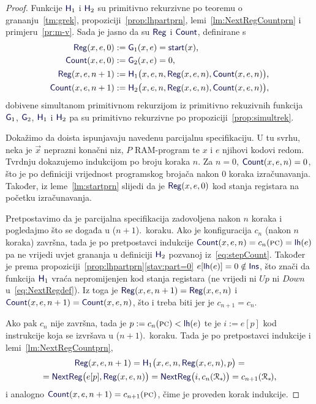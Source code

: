 \begin{proof}
Funkcije $\f H_1$ i $\f H_2$ su primitivno rekurzivne po teoremu o grananju~\ref{tm:grek}, propoziciji~\ref{prop:lhpartprn}, lemi~\ref{lm:NextRegCountprn} i primjeru~\ref{pr:m-v}. Sada je jasno da su $\f{Reg}$ i $\f{Count}$, definirane s
\begin{align}
    \f{Reg}(x,e,0)&:=\f G_1(x,e)=\f{start}(x)\text,\\
    \f{Count}(x,e,0)&:=\f G_2(x,e)=0\text,\\
    \label{eq:stepReg}\f{Reg}(x,e,n+1)&:=\f H_1\bigl(x,e,n,\f{Reg}(x,e,n),\f{Count}(x,e,n)\bigr)\text,\\
    \label{eq:stepCount}\f{Count}(x,e,n+1)&:=\f H_2\bigl(x,e,n,\f{Reg}(x,e,n),\f{Count}(x,e,n)\bigr)\text,
\end{align}
dobivene simultanom primitivnom rekurzijom iz primitivno rekuzivnih funkcija $\f G_1$, $\f G_2$, $\f H_1$ i $\f H_2$ pa su primitivno rekurzivne po propoziciji~\ref{prop:simultrek}.

    Dokažimo da doista ispunjavaju navedenu parcijalnu specifikaciju. U tu svrhu, neka je $\vec x$ neprazni konačni niz, $P$ RAM-program te $x$ i $e$ njihovi kodovi redom. Tvrdnju dokazujemo indukcijom po broju koraka $n$. Za $n=0$, $\f{Count}(x,e,n)=0$, što je po definiciji vrijednost programskog brojača nakon $0$ koraka izračunavanja. Također, iz leme~\ref{lm:startprn} slijedi da je $\f{Reg}(x,e,0)$ kod stanja registara na početku izračunavanja.

	Pretpostavimo da je parcijalna specifikacija zadovoljena nakon $n$ koraka i pogledajmo što se događa u ($n+1$).\ koraku. Ako je konfiguracija $c_n$ (nakon $n$ koraka) završna, tada je po pretpostavci indukcije $\f{Count}(x,e,n)=c_n(\textsc{pc})=\f{lh}(e)$ pa ne vrijedi uvjet grananja u definiciji $\f H_2$ pozvanoj  iz~\eqref{eq:stepCount}. Također je prema propoziciji~\ref{prop:lhpartprn}\eqref{stav:part=0} $e[\f{lh}(e)]=0\notin\f{Ins}$, što znači da funkcija $\f H_1$ vraća nepromijenjen kod stanja registara (ne vrijedi ni $Up$ ni $Down$ u~\eqref{eq:NextRegdef}). Iz toga je $\f{Reg}(x,e,n+1)=\f{Reg}(x,e,n)$ i $\f{Count}(x,e,n+1)=\f{Count}(x,e,n)$, što i treba biti jer je $c_{n+1}=c_n$.

Ako pak $c_n$ nije završna, tada je $p:=c_n(\textsc{pc})<\f{lh}(e)$ te je $i:=e[p]$ kod instrukcije koja se izvršava u ($n+1$).\ koraku. Tada je po pretpostavci indukcije i lemi~\ref{lm:NextRegCountprn},
\begin{multline}
    \f{Reg}(x,e,n+1)=\f H_1\bigl(x,e,n,\f{Reg}(x,e,n),p\bigr)=\\
	=\f{NextReg}\bigl(e[p],\f{Reg}(x,e,n)\bigr)=\f{NextReg}\bigl(i,c_n(\reg{*}\mspace{-2mu})\bigr)=c_{n+1}(\reg{*}\mspace{-2mu})\text,
\end{multline}
i analogno $\f{Count}(x,e,n+1)=c_{n+1}(\textsc{pc})$, čime je proveden korak indukcije.
\end{proof}

